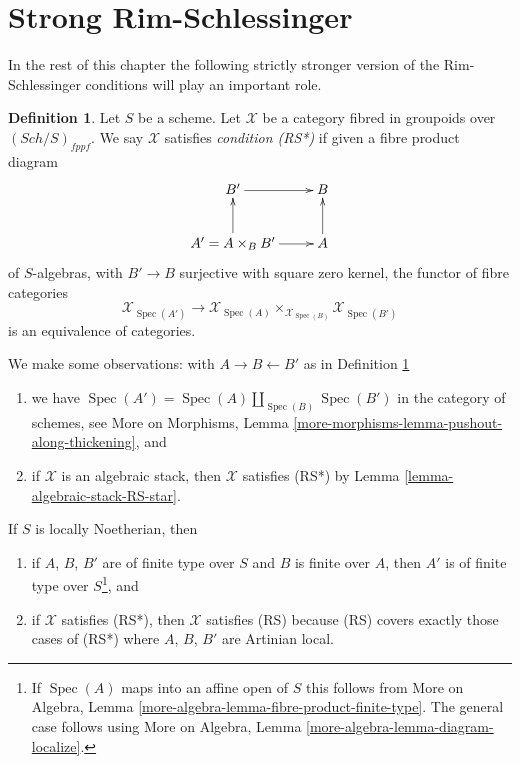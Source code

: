 \documentclass{stacks-project}
\theoremstyle{plain}
\theoremstyle{definition}
\newtheorem{definition}[subsection]{Definition}
\theoremstyle{remark}
\numberwithin{equation}{subsection}
\def\Spec{\mathop{\mathrm{Spec}}}
\def\Sch{\mathit{Sch}}
\begin{document}
\section{Strong Rim-Schlessinger}
\label{section-RS-star}

\noindent
In the rest of this chapter the following strictly stronger version
of the Rim-Schlessinger conditions will play an important role.

\begin{definition}
\label{definition-RS-star}
Let $S$ be a scheme. Let $\mathcal{X}$ be a category
fibred in groupoids over $(\Sch/S)_{fppf}$. We say $\mathcal{X}$
satisfies {\it condition (RS*)} if given a fibre product diagram
$$
\xymatrix{
B' \ar[r] & B \\
A' = A \times_B B' \ar[u] \ar[r] & A \ar[u]
}
$$
of $S$-algebras, with $B' \to B$ surjective with square zero kernel,
the functor of fibre categories
$$
\mathcal{X}_{\Spec(A')}
\longrightarrow
\mathcal{X}_{\Spec(A)} \times_{\mathcal{X}_{\Spec(B)}} \mathcal{X}_{\Spec(B')}
$$
is an equivalence of categories.
\end{definition}

\noindent
We make some observations:
with $A \to B \leftarrow B'$ as in Definition \ref{definition-RS-star}
\begin{enumerate}
\item we have $\Spec(A') = \Spec(A) \amalg_{\Spec(B)} \Spec(B')$
in the category of schemes, see
More on Morphisms, Lemma \ref{more-morphisms-lemma-pushout-along-thickening},
and
\item if $\mathcal{X}$ is an algebraic stack, then $\mathcal{X}$ satisfies
(RS*) by Lemma \ref{lemma-algebraic-stack-RS-star}.
\end{enumerate}
If $S$ is locally Noetherian, then
\begin{enumerate}
\item[(3)] if $A$, $B$, $B'$ are of finite type over $S$ and
$B$ is finite over $A$, then $A'$ is of finite type over
$S$\footnote{If $\Spec(A)$ maps into an affine open of $S$
this follows from
More on Algebra, Lemma \ref{more-algebra-lemma-fibre-product-finite-type}.
The general case follows using
More on Algebra, Lemma \ref{more-algebra-lemma-diagram-localize}.}, and
\item[(4)] if $\mathcal{X}$ satisfies (RS*), then $\mathcal{X}$ satisfies (RS)
because (RS) covers exactly those cases of (RS*) where
$A$, $B$, $B'$ are Artinian local.
\end{enumerate}
\end{document}
